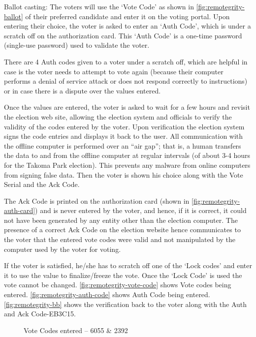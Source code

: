Ballot casting: The voters will use the `Vote Code' as shown in
\autoref{fig:remotegrity-ballot} of their preferred candidate and
enter it on the voting portal. Upon entering their choice, the voter
is asked to enter an `Auth Code', which is under a scratch off on the
authorization card. This `Auth Code' is a one-time password
(single-use password) used to validate the voter.

There are 4 Auth codes given to a voter under a scratch off, which are
helpful in case is the voter needs to attempt to vote again (because
their computer performs a denial of service attack or does not respond
correctly to instructions) or in case there is a dispute over the
values entered.

Once the values are entered, the voter is asked to wait for a few
hours and revisit the election web site, allowing the election system
and officials to verify the validity of the codes entered by the
voter. Upon verification the election system signs the code entries
and displays it back to the user. All communication with the offline
computer is performed over an ``air gap''; that is, a human transfers
the data to and from the offline computer at regular intervals (of
about 3-4 hours for the Takoma Park election). This prevents any
malware from online computers from signing false data. Then the voter
is shown his choice along with the Vote Serial and the Ack Code.

The Ack Code is printed on the authorization card (shown in
\autoref{fig:remotegrity-auth-card}) and is never entered by the
voter, and hence, if it is correct, it could not have been generated
by any entity other than the election computer. The presence of a
correct Ack Code on the election website hence communicates to the
voter that the entered vote codes were valid and not manipulated by
the computer used by the voter for voting.

If the voter is satisfied, he/she has to scratch off one of the `Lock
codes' and enter it to use the value to finalize/freeze the vote. Once
the `Lock Code' is used the vote cannot be
changed. \autoref{fig:remotegrity-vote-code} shows Vote codes being
entered. \autoref{fig:remotegrity-auth-code} shows Auth Code being
entered. \autoref{fig:remotegrity-bb} shows the verification back to
the voter along with the Auth and Ack Code-EB3C15.

\begin{figure}
  \centering {}
  \caption{Vote Codes entered -- 6055 \& 2392}
  \label{fig:remotegrity-vote-code}
\end{figure}

